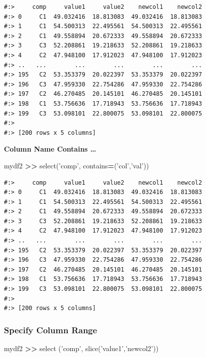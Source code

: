 \documentclass[
]{book}
\newenvironment{Shaded}{\begin{snugshade}}{\end{snugshade}}
\newcommand{\BuiltInTok}[1]{#1}
\newcommand{\NormalTok}[1]{#1}
\newcommand{\OperatorTok}[1]{\textcolor[rgb]{0.43,0.43,0.43}{\textbf{#1}}}
\newcommand{\StringTok}[1]{\textcolor[rgb]{0.5,0.5,0.5}{#1}}
\begin{document}
\begin{verbatim}
#:>     comp     value1     value2    newcol1    newcol2
#:> 0     C1  49.032416  18.813083  49.032416  18.813083
#:> 1     C1  54.500313  22.495561  54.500313  22.495561
#:> 2     C1  49.558894  20.672333  49.558894  20.672333
#:> 3     C3  52.208861  19.218633  52.208861  19.218633
#:> 4     C2  47.948100  17.912023  47.948100  17.912023
#:> ..   ...        ...        ...        ...        ...
#:> 195   C2  53.353379  20.022397  53.353379  20.022397
#:> 196   C3  47.959330  22.754286  47.959330  22.754286
#:> 197   C2  46.270485  20.145101  46.270485  20.145101
#:> 198   C1  53.756636  17.718943  53.756636  17.718943
#:> 199   C3  53.098101  22.800075  53.098101  22.800075
#:> 
#:> [200 rows x 5 columns]
\end{verbatim}

\textbf{Column Name Contains \ldots{}}

\begin{Shaded}
\begin{Highlighting}[]
\NormalTok{mydf2 }\OperatorTok{>>}\NormalTok{ select(}\StringTok{'comp'}\NormalTok{, contains}\OperatorTok{=}\NormalTok{(}\StringTok{'col'}\NormalTok{,}\StringTok{'val'}\NormalTok{))}
\end{Highlighting}
\end{Shaded}

\begin{verbatim}
#:>     comp     value1     value2    newcol1    newcol2
#:> 0     C1  49.032416  18.813083  49.032416  18.813083
#:> 1     C1  54.500313  22.495561  54.500313  22.495561
#:> 2     C1  49.558894  20.672333  49.558894  20.672333
#:> 3     C3  52.208861  19.218633  52.208861  19.218633
#:> 4     C2  47.948100  17.912023  47.948100  17.912023
#:> ..   ...        ...        ...        ...        ...
#:> 195   C2  53.353379  20.022397  53.353379  20.022397
#:> 196   C3  47.959330  22.754286  47.959330  22.754286
#:> 197   C2  46.270485  20.145101  46.270485  20.145101
#:> 198   C1  53.756636  17.718943  53.756636  17.718943
#:> 199   C3  53.098101  22.800075  53.098101  22.800075
#:> 
#:> [200 rows x 5 columns]
\end{verbatim}

\hypertarget{specify-column-range}{%
\subsubsection{Specify Column Range}\label{specify-column-range}}

\begin{Shaded}
\begin{Highlighting}[]
\NormalTok{mydf2 }\OperatorTok{>>}\NormalTok{ select (}\StringTok{'comp'}\NormalTok{, }\BuiltInTok{slice}\NormalTok{(}\StringTok{'value1'}\NormalTok{,}\StringTok{'newcol2'}\NormalTok{))}
\end{Highlighting}
\end{Shaded}
\end{document}
